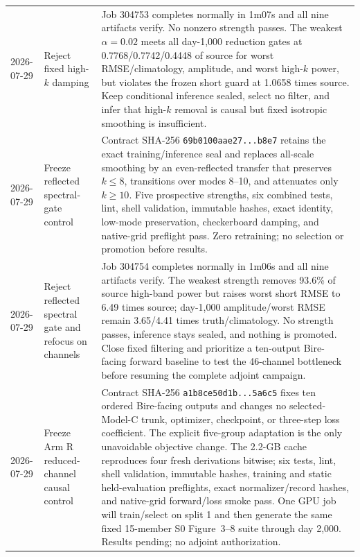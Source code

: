 \documentclass[11pt]{article}
\begin{document}
\begin{longtable}{@{}p{}p{}p{}@{}}
2026-07-29 & Reject fixed high-\(k\) damping & Job 304753 completes normally in 1m07s and all nine artifacts verify.  No nonzero strength passes.  The weakest \(\alpha=0.02\) meets all day-1,000 reduction gates at 0.7768/0.7742/0.4448 of source for worst RMSE/climatology, amplitude, and worst high-\(k\) power, but violates the frozen short guard at 1.0658 times source.  Keep conditional inference sealed, select no filter, and infer that high-\(k\) removal is causal but fixed isotropic smoothing is insufficient. \\
2026-07-29 & Freeze reflected spectral-gate control & Contract SHA-256 \texttt{69b0100aae27...b8e7} retains the exact training/inference seal and replaces all-scale smoothing by an even-reflected transfer that preserves \(k\leq8\), transitions over modes 8--10, and attenuates only \(k\geq10\).  Five prospective strengths, six combined tests, lint, shell validation, immutable hashes, exact identity, low-mode preservation, checkerboard damping, and native-grid preflight pass.  Zero retraining; no selection or promotion before results. \\
2026-07-29 & Reject reflected spectral gate and refocus on channels & Job 304754 completes normally in 1m06s and all nine artifacts verify.  The weakest strength removes 93.6\% of source high-band power but raises worst short RMSE to 6.49 times source; day-1,000 amplitude/worst RMSE remain 3.65/4.41 times truth/climatology.  No strength passes, inference stays sealed, and nothing is promoted.  Close fixed filtering and prioritize a ten-output Bire-facing forward baseline to test the 46-channel bottleneck before resuming the complete adjoint campaign. \\
2026-07-29 & Freeze Arm R reduced-channel causal control & Contract SHA-256 \texttt{a1b8ce50d1b...5a6c5} fixes ten ordered Bire-facing outputs and changes no selected-Model-C trunk, optimizer, checkpoint, or three-step loss coefficient.  The explicit five-group adaptation is the only unavoidable objective change.  The 2.2-GB cache reproduces four fresh derivations bitwise; six tests, lint, shell validation, immutable hashes, training and static held-evaluation preflights, exact normalizer/record hashes, and native-grid forward/loss smoke pass.  One GPU job will train/select on split 1 and then generate the same fixed 15-member S0 Figure~3--8 suite through day 2,000.  Results pending; no adjoint authorization. \\

\end{longtable}
\end{document}
